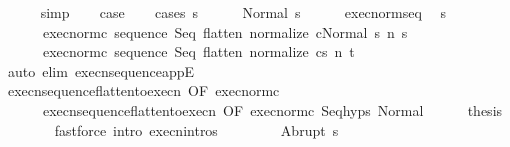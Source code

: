 \begin{isabellebody}
\ \ \ \ \isamarkupfalse%
\ simp\isanewline
\ \ \isamarkupfalse%
\ {\isacharquery}case\isanewline
\ \ \isamarkupfalse%
\ {\isacharparenleft}cases\ s{\isacharparenright}\isanewline
\ \ \ \ \isamarkupfalse%
\ {\isacharparenleft}Normal\ s{\isacharprime}{\isacharparenright}\isanewline
\ \ \ \ \isamarkupfalse%
\ exec{\isacharunderscore}norm{\isacharunderscore}seq\ \isamarkupfalse%
\ s{\isacharprime}{\isacharprime}\ \isanewline
\ \ \ \ \ \ exec{\isacharunderscore}norm{\isacharunderscore}c{}{\isacharcolon}\ {\isachardoublequoteopen}{\isasymGamma}{\isasymturnstile}{\isasymlangle}sequence\ Seq\ {\isacharparenleft}flatten\ {\isacharparenleft}normalize\ c{}{\isacharparenright}{\isacharparenright}{\isacharcomma}Normal\ s{\isacharprime}{\isasymrangle}\ {\isacharequal}n{\isasymRightarrow}\ s{\isacharprime}{\isacharprime}{\isachardoublequoteclose}\ \isanewline
\ \ \ \ \ \ exec{\isacharunderscore}norm{\isacharunderscore}c{}{\isacharcolon}\ {\isachardoublequoteopen}{\isasymGamma}{\isasymturnstile}{\isasymlangle}sequence\ Seq\ {\isacharparenleft}flatten\ {\isacharparenleft}normalize\ c{}{\isacharparenright}{\isacharparenright}{\isacharcomma}s{\isacharprime}{\isacharprime}{\isasymrangle}\ {\isacharequal}n{\isasymRightarrow}\ t{\isachardoublequoteclose}\isanewline
\ \ \ \ \ \ \isamarkupfalse%
\ {\isacharparenleft}auto\ elim{\isacharcolon}\ execn{\isacharunderscore}sequence{\isacharunderscore}appE{\isacharparenright}\isanewline
\ \ \ \ \isamarkupfalse%
\ execn{\isacharunderscore}sequence{\isacharunderscore}flatten{\isacharunderscore}to{\isacharunderscore}execn\ {\isacharbrackleft}OF\ exec{\isacharunderscore}norm{\isacharunderscore}c{}{\isacharbrackright}\isanewline
\ \ \ \ \ \ execn{\isacharunderscore}sequence{\isacharunderscore}flatten{\isacharunderscore}to{\isacharunderscore}execn\ {\isacharbrackleft}OF\ exec{\isacharunderscore}norm{\isacharunderscore}c{}{\isacharbrackright}\ Seq{\isachardot}hyps\ Normal\isanewline
\ \ \ \ \isamarkupfalse%
\ {\isacharquery}thesis\isanewline
\ \ \ \ \ \ \isamarkupfalse%
\ {\isacharparenleft}fastforce\ intro{\isacharcolon}\ execn{\isachardot}intros{\isacharparenright}\isanewline
\ \ \isamarkupfalse%
\isanewline
\ \ \ \ \isamarkupfalse%
\ {\isacharparenleft}Abrupt\ s{\isacharprime}{\isacharparenright}\isanewline
\ \ \ \ \isamarkupfalse%

\end{isabellebody}
